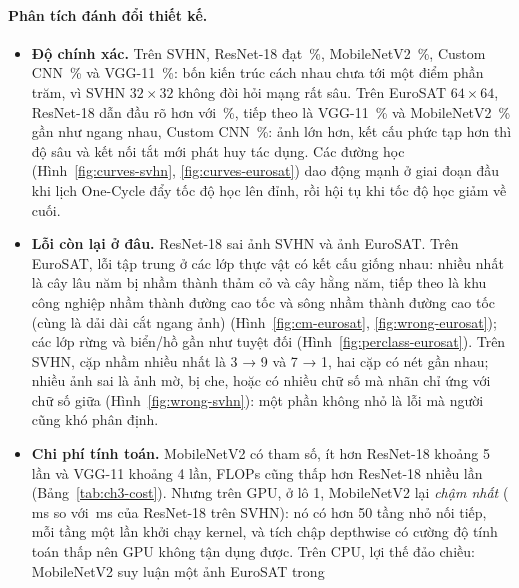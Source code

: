 \paragraph{Phân tích đánh đổi thiết kế.}
\begin{itemize}
  \item \textbf{Độ chính xác.} Trên SVHN, ResNet-18 đạt \,\%, MobileNetV2
    \,\%, Custom CNN \,\% và VGG-11 \,\%:
    bốn kiến trúc cách nhau chưa tới một điểm phần trăm, vì SVHN $32{\times}32$ không đòi hỏi mạng rất sâu. Trên EuroSAT
    $64{\times}64$, ResNet-18 dẫn đầu rõ hơn với \,\%, tiếp theo là VGG-11
    \,\% và MobileNetV2 \,\% gần như ngang nhau, Custom CNN
    \,\%: ảnh lớn hơn, kết cấu phức tạp hơn thì độ sâu và kết nối tắt mới phát huy tác dụng.
    Các đường học (Hình~\ref{fig:curves-svhn}, \ref{fig:curves-eurosat}) dao động mạnh ở giai đoạn đầu khi lịch One-Cycle đẩy
    tốc độ học lên đỉnh, rồi hội tụ khi tốc độ học giảm về cuối.
  \item \textbf{Lỗi còn lại ở đâu.} ResNet-18 sai  ảnh SVHN và  ảnh
    EuroSAT. Trên EuroSAT, lỗi tập trung ở các lớp thực vật có kết cấu giống nhau: nhiều nhất là cây lâu năm bị nhầm thành
    thảm cỏ và cây hằng năm, tiếp theo là khu công nghiệp nhầm thành đường cao tốc và sông nhầm thành đường cao tốc (cùng là
    dải dài cắt ngang ảnh) (Hình~\ref{fig:cm-eurosat}, \ref{fig:wrong-eurosat}); các lớp rừng và biển/hồ gần như tuyệt đối
    (Hình~\ref{fig:perclass-eurosat}). Trên SVHN, cặp nhầm nhiều nhất là 3 → 9 và 7 → 1, hai cặp có nét gần nhau; nhiều ảnh sai
    là ảnh mờ, bị che, hoặc có nhiều chữ số mà nhãn chỉ ứng với chữ số giữa (Hình~\ref{fig:wrong-svhn}): một phần không nhỏ là
    lỗi mà người cũng khó phân định.
  \item \textbf{Chi phí tính toán.} MobileNetV2 có  tham số, ít hơn ResNet-18 khoảng 5 lần
    và VGG-11 khoảng 4 lần, FLOPs cũng thấp hơn ResNet-18 nhiều lần (Bảng~\ref{tab:ch3-cost}). Nhưng trên GPU, ở lô 1,
    MobileNetV2 lại \emph{chậm nhất} (\,ms so với \,ms
    của ResNet-18 trên SVHN): nó có hơn 50 tầng nhỏ nối tiếp, mỗi tầng một lần khởi chạy kernel, và tích chập depthwise có
    cường độ tính toán thấp nên GPU không tận dụng được. Trên CPU, lợi thế đảo chiều: MobileNetV2 suy luận một ảnh EuroSAT trong

\end{itemize}
